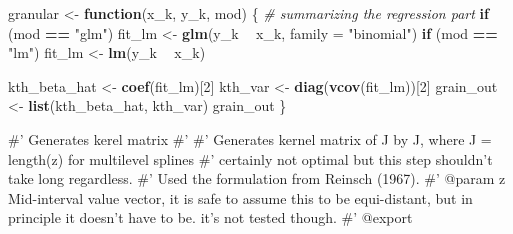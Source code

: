 \documentclass[
]{article}
\newenvironment{Shaded}{\begin{snugshade}}{\end{snugshade}}
\newcommand{\CommentTok}[1]{\textcolor[rgb]{0.56,0.35,0.01}{\textit{#1}}}
\newcommand{\ControlFlowTok}[1]{\textcolor[rgb]{0.13,0.29,0.53}{\textbf{#1}}}
\newcommand{\DataTypeTok}[1]{\textcolor[rgb]{0.13,0.29,0.53}{#1}}
\newcommand{\DecValTok}[1]{\textcolor[rgb]{0.00,0.00,0.81}{#1}}
\newcommand{\KeywordTok}[1]{\textcolor[rgb]{0.13,0.29,0.53}{\textbf{#1}}}
\newcommand{\NormalTok}[1]{#1}
\newcommand{\OperatorTok}[1]{\textcolor[rgb]{0.81,0.36,0.00}{\textbf{#1}}}
\newcommand{\StringTok}[1]{\textcolor[rgb]{0.31,0.60,0.02}{#1}}
\begin{document}
\begin{Shaded}
\begin{Highlighting}[]
\NormalTok{granular <-}\StringTok{ }\ControlFlowTok{function}\NormalTok{(x_k, y_k, mod) \{}
  \CommentTok{# summarizing the regression part}
  \ControlFlowTok{if}\NormalTok{ (mod }\OperatorTok{==}\StringTok{ "glm"}\NormalTok{)}
\NormalTok{    fit_lm <-}\StringTok{ }\KeywordTok{glm}\NormalTok{(y_k }\OperatorTok{~}\StringTok{ }\NormalTok{x_k, }\DataTypeTok{family =} \StringTok{"binomial"}\NormalTok{)}
  \ControlFlowTok{if}\NormalTok{ (mod }\OperatorTok{==}\StringTok{ "lm"}\NormalTok{)}
\NormalTok{    fit_lm <-}\StringTok{ }\KeywordTok{lm}\NormalTok{(y_k }\OperatorTok{~}\StringTok{ }\NormalTok{x_k)}

\NormalTok{  kth_beta_hat <-}\StringTok{ }\KeywordTok{coef}\NormalTok{(fit_lm)[}\DecValTok{2}\NormalTok{]}
\NormalTok{  kth_var <-}\StringTok{ }\KeywordTok{diag}\NormalTok{(}\KeywordTok{vcov}\NormalTok{(fit_lm))[}\DecValTok{2}\NormalTok{]}
\NormalTok{  grain_out <-}\StringTok{ }\KeywordTok{list}\NormalTok{(kth_beta_hat, kth_var)}
\NormalTok{  grain_out}
\NormalTok{\}}
\end{Highlighting}
\end{Shaded}

\#' Generates kerel matrix \#' \#' Generates kernel matrix of J by J,
where J = length(z) for multilevel splines \#' certainly not optimal but
this step shouldn't take long regardless. \#' Used the formulation from
Reinsch (1967). \#' @param z Mid-interval value vector, it is safe to
assume this to be equi-distant, but in principle it doesn't have to be.
it's not tested though. \#' @export
\end{document}

